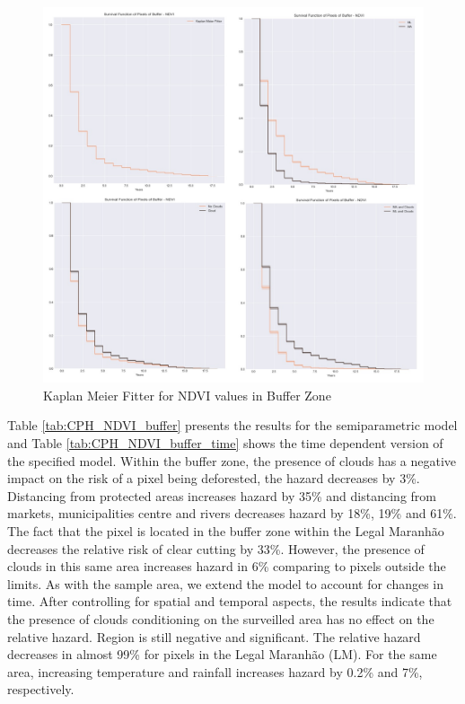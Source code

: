 \begin{figure}[H]
  \centering
  \includegraphics[width=1\textwidth]{KM_NDVI_buffer_total.jpg}
\caption{Kaplan Meier Fitter for NDVI values in Buffer Zone}
\label{fig:km-total-buffer}
\end{figure}


Table \ref{tab:CPH_NDVI_buffer} presents the results for the semiparametric model and Table \ref{tab:CPH_NDVI_buffer_time} shows the time dependent version of the specified model. Within the buffer zone, the presence of clouds has a negative impact on the risk of a pixel being deforested, the hazard decreases by 3\%. Distancing from protected areas increases hazard by 35\% and distancing from markets, municipalities centre and rivers decreases hazard by 18\%, 19\% and 61\%. The fact that the pixel is located in the buffer zone within the Legal Maranhão decreases the relative risk of clear cutting by 33\%. However, the presence of clouds in this same area increases hazard in 6\% comparing to pixels outside the limits. As with the sample area, we extend the model to account for changes in time. After controlling for spatial and temporal aspects, the results indicate that the presence of clouds conditioning on the surveilled area has no effect on the relative hazard. Region is still negative and significant. The relative hazard decreases in almost 99\% for pixels in the Legal Maranhão (LM). For the same area, increasing temperature and rainfall increases hazard by 0.2\% and 7\%, respectively.

